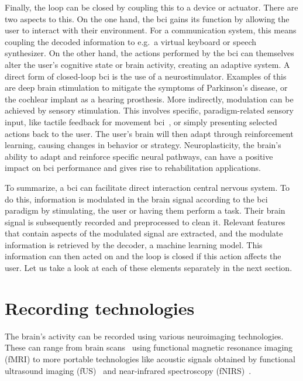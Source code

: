 Finally, the loop can be closed by coupling this to a
device or actuator.
There are two aspects to this.
On the one hand, the \ac{bci} gains its function by allowing the user to interact
with their environment.
For a communication system, this means coupling the decoded information to
e.g.\ a virtual keyboard or speech synthesizer.
On the other hand, the actions performed by the \ac{bci} can themselves alter
the user's cognitive state or brain activity, creating an adaptive system.
A direct form of closed-loop \ac{bci} is the use of a neurostimulator.
Examples of this are deep brain stimulation to mitigate the symptoms of
Parkinson's disease, or the cochlear implant as a hearing prosthesis.
More indirectly, modulation can be achieved by sensory stimulation.
This involves specific, paradigm-related sensory input, like tactile
feedback for movement \ac{bci}~\cite{Flesher2021}, or simply presenting selected actions
back to the user.
The user's brain will then adapt through reinforcement learning, causing
changes in behavior or strategy.
Neuroplasticity, the brain's ability to adapt and reinforce specific neural
pathways, can have a positive impact on \ac{bci} performance and gives rise to
rehabilitation applications.


To summarize, a \ac{bci} can facilitate direct interaction central nervous system.
To do this, information is modulated in the brain signal according to the
\ac{bci} paradigm by stimulating, the user or having them perform a task.
Their brain signal is subsequently recorded and preprocessed to clean it.
Relevant features that contain aspects of the modulated signal are extracted,
and the modulate information is retrieved by the decoder, a machine learning
model.
This information can then acted on and the loop is closed if this action
affects the user.
Let us take a look at each of these elements separately in the next section.

\section{Recording technologies}
\label{sec:bci-recording}

The brain's activity can be recorded using various neuroimaging
technologies.
These can range from brain scans~\cite{Weiskopf2004} using functional magnetic resonance imaging
(fMRI) to more portable technologies like acoustic signals obtained by functional ultrasound imaging
(fUS)~\cite{Zheng2023} and near-infrared spectroscopy
(fNIRS)~\cite{Borgheai2020}.

